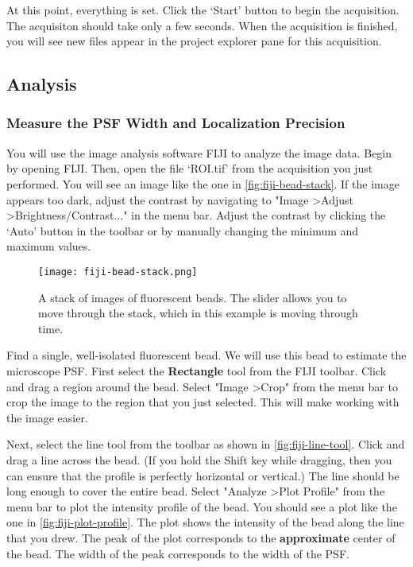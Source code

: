 \documentclass[10pt,a4paper,oneside]{book}
\begin{document}
At this point, everything is set. Click the `Start' button to begin the acquisition. The acquisiton should take only a few seconds. When the acquisition is finished, you will see new files appear in the project explorer pane for this acquisition.

\subsection{Analysis}

\subsubsection{Measure the PSF Width and Localization Precision}

You will use the image analysis software FIJI to analyze the image data. Begin by opening FIJI. Then, open the file `ROI.tif' from the acquisition you just performed. You will see an image like the one in \autoref{fig:fiji-bead-stack}. If the image appears too dark, adjust the contrast by navigating to "Image \textgreater Adjust \textgreater Brightness/Contrast..." in the menu bar. Adjust the contrast by clicking the `Auto' button in the toolbar or by manually changing the minimum and maximum values.

\begin{figure}[ht]
    \centering
    \texttt{[image: fiji-bead-stack.png]}
    \caption{A stack of images of fluorescent beads. The slider allows you to move through the stack, which in this example is moving through time.}
    \label{fig:fiji-bead-stack}
\end{figure}

Find a single, well-isolated fluorescent bead. We will use this bead to estimate the microscope PSF. First select the \textbf{Rectangle} tool from the FIJI toolbar. Click and drag a region around the bead. Select "Image \textgreater Crop" from the menu bar to crop the image to the region that you just selected. This will make working with the image easier.

Next, select the line tool from the toolbar as shown in \autoref{fig:fiji-line-tool}. Click and drag a line across the bead. (If you hold the Shift key while dragging, then you can ensure that the profile is perfectly horizontal or vertical.) The line should be long enough to cover the entire bead. Select "Analyze \textgreater Plot Profile" from the menu bar to plot the intensity profile of the bead. You should see a plot like the one in \autoref{fig:fiji-plot-profile}. The plot shows the intensity of the bead along the line that you drew. The peak of the plot corresponds to the \textbf{approximate} center of the bead. The width of the peak corresponds to the width of the PSF.
\end{document}
